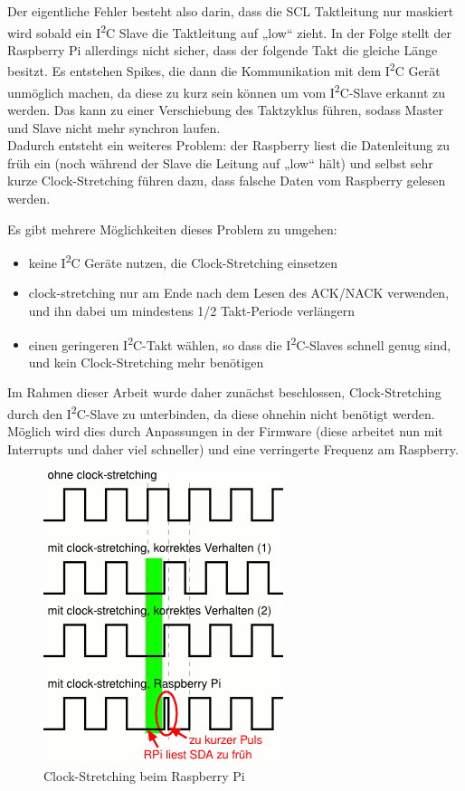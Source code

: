 Der eigentliche Fehler besteht also darin, dass die SCL Taktleitung nur maskiert wird sobald ein I\textsuperscript{2}C Slave die Taktleitung auf „low“ zieht. In der Folge stellt der Raspberry Pi allerdings nicht sicher, dass der folgende Takt die gleiche Länge besitzt. Es entstehen Spikes, die dann die Kommunikation mit dem I\textsuperscript{2}C Gerät unmöglich machen, da diese zu kurz sein können um vom I\textsuperscript{2}C-Slave erkannt zu werden. Das kann zu einer Verschiebung des Taktzyklus führen, sodass Master und Slave nicht mehr synchron laufen. \\
Dadurch entsteht ein weiteres Problem: der Raspberry liest die Datenleitung zu früh ein (noch während der Slave die Leitung auf „low“ hält) und selbst sehr kurze Clock-Stretching führen dazu, dass falsche Daten vom Raspberry gelesen werden.

Es gibt mehrere Möglichkeiten dieses Problem zu umgehen:
\begin{itemize}
	\item keine I\textsuperscript{2}C Geräte nutzen, die Clock-Stretching einsetzen
	\item clock-stretching nur am Ende nach dem Lesen des ACK/NACK verwenden, und ihn dabei um mindestens 1/2 Takt-Periode verlängern
	\item einen geringeren I\textsuperscript{2}C-Takt wählen, so dass die I\textsuperscript{2}C-Slaves schnell genug sind, und kein Clock-Stretching mehr benötigen
\end{itemize}
Im Rahmen dieser Arbeit wurde daher zunächst beschlossen, Clock-Stretching durch den I\textsuperscript{2}C-Slave zu unterbinden, da diese ohnehin nicht benötigt werden. Möglich wird dies durch Anpassungen in der Firmware (diese arbeitet nun mit Interrupts und daher viel schneller) und eine verringerte Frequenz am Raspberry.


\begin{figure}[H]
	\centering
	\includegraphics[scale=0.8]{images/rpi-i2c-bug.png}
	\caption{Clock-Stretching beim Raspberry Pi\footnotemark}
\end{figure}

